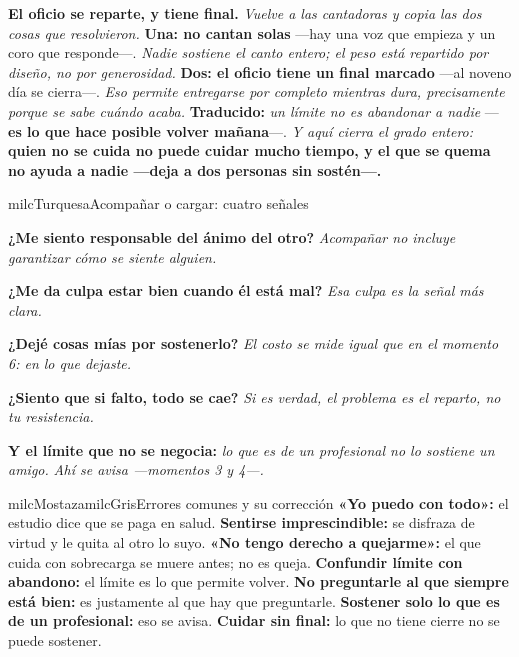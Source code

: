 \documentclass[11pt,letterpaper]{article}
\newcommand{\milcpaso}[3]{%
\Needspace{4\baselineskip}%
\begin{tcolorbox}[enhanced,colback=white,colframe=milcLinea,arc=1.5mm,boxrule=.9pt,
  left=14mm,right=4mm,top=3mm,bottom=3mm,before skip=4pt,after skip=4pt,
  fontupper=\RaggedRight,
  overlay={\node[anchor=north west,circle,fill=#2,text=white,inner sep=0pt,
    minimum size=7.4mm,font=\sffamily\bfseries\small]
    at ([xshift=3.6mm,yshift=-3.2mm]frame.north west) {#1};}]
#3
\end{tcolorbox}}
\begin{document}
\milcpaso{4}{milcTurquesa}{\textbf{El oficio se reparte, y tiene final.} \emph{Vuelve a las cantadoras y copia las dos cosas que resolvieron.} \textbf{Una: no cantan solas} ---hay una voz que empieza y un coro que responde---. \emph{Nadie sostiene el canto entero; el peso está repartido por diseño, no por generosidad.} \textbf{Dos: el oficio tiene un final marcado} ---al noveno día se cierra---. \emph{Eso permite entregarse por completo mientras dura, precisamente porque se sabe cuándo acaba.} \textbf{Traducido:} \emph{un límite no es abandonar a nadie} ---\textbf{es lo que hace posible volver mañana}---. \emph{Y aquí cierra el grado entero:} \textbf{quien no se cuida no puede cuidar mucho tiempo, y el que se quema no ayuda a nadie ---deja a dos personas sin sostén---.}}

\begin{drawbox}{milcTurquesa}{Acompañar o cargar: cuatro señales}
\begin{pasoslista}
\item \textbf{¿Me siento responsable del ánimo del otro?} \emph{Acompañar no incluye garantizar cómo se siente alguien.}
\item \textbf{¿Me da culpa estar bien cuando él está mal?} \emph{Esa culpa es la señal más clara.}
\item \textbf{¿Dejé cosas mías por sostenerlo?} \emph{El costo se mide igual que en el momento 6: en lo que dejaste.}
\item \textbf{¿Siento que si falto, todo se cae?} \emph{Si es verdad, el problema es el reparto, no tu resistencia.}
\item \textbf{Y el límite que no se negocia:} \emph{lo que es de un profesional no lo sostiene un amigo.} \emph{Ahí se avisa ---momentos 3 y 4---.}
\end{pasoslista}
\end{drawbox}

\begin{softbox}{milcMostaza}{milcGris}{Errores comunes y su corrección}
\textbf{«Yo puedo con todo»:} el estudio dice que se paga en salud. \textbf{Sentirse imprescindible:} se disfraza de virtud y le quita al otro lo suyo. \textbf{«No tengo derecho a quejarme»:} el que cuida con sobrecarga se muere antes; no es queja. \textbf{Confundir límite con abandono:} el límite es lo que permite volver. \textbf{No preguntarle al que siempre está bien:} es justamente al que hay que preguntarle. \textbf{Sostener solo lo que es de un profesional:} eso se avisa. \textbf{Cuidar sin final:} lo que no tiene cierre no se puede sostener.
\end{softbox}
\end{document}
